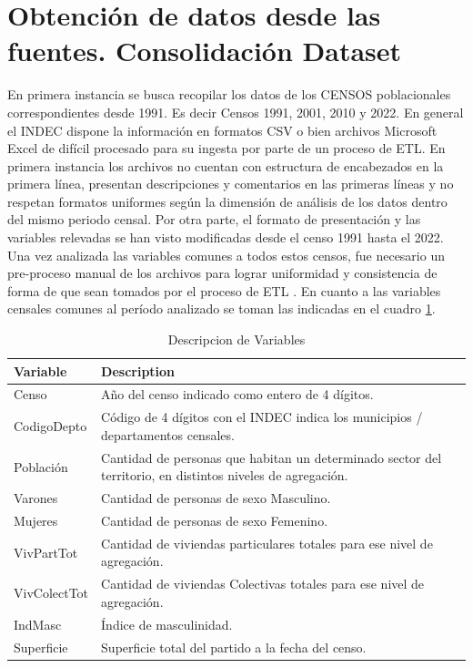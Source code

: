 \documentclass{article}
\theoremstyle{mytheoremstyle}
\theoremstyle{mytheoremstyle}
\theoremstyle{myproblemstyle}
\begin{document}
 \section{Obtención de datos desde las fuentes. Consolidación Dataset }
 En primera instancia se busca recopilar los datos de los CENSOS poblacionales correspondientes desde 1991. Es decir Censos 1991, 2001, 2010 y 2022.  En general el INDEC dispone la información en formatos CSV o bien archivos Microsoft Excel  de difícil procesado para su ingesta por parte de un  proceso de ETL.  En primera instancia los archivos no cuentan con estructura de encabezados en la primera línea, presentan descripciones y comentarios en las primeras líneas y no respetan formatos uniformes según la dimensión de análisis de los datos dentro del mismo periodo censal. Por otra parte, el formato de presentación y las variables relevadas se han visto modificadas desde el censo 1991 hasta el 2022. Una vez analizada las variables comunes a todos estos censos, fue necesario un pre-proceso manual de los archivos para lograr uniformidad y consistencia de forma de que sean tomados por el proceso de ETL .
 En cuanto a las variables censales comunes al
  período analizado se toman las indicadas en el cuadro  \ref{variables}.
 

 \begin{table}[htbp]
     \centering
     \caption{Descripcion de Variables}
     \begin{tabular}{|l|p{8cm}|}
         \hline
         \textbf{Variable} & \textbf{Description} \\
         \hline
         Censo & Año del censo indicado como entero de 4 dígitos. \\
         CodigoDepto & Código de 4 dígitos con el INDEC indica los municipios / departamentos censales. \\
         Población & Cantidad de personas que habitan un determinado sector del territorio, en distintos niveles de agregación. \\
         Varones & Cantidad de personas de sexo Masculino. \\
         Mujeres & Cantidad de personas de sexo Femenino. \\
         VivPartTot & Cantidad de viviendas particulares totales para ese nivel de agregación. \\
         VivColectTot & Cantidad de viviendas Colectivas totales para ese nivel de agregación. \\
         IndMasc & Índice de masculinidad. \\
         Superficie & Superficie total del partido a la fecha del censo. \\
         \hline
     \end{tabular}
     \label{variables}
 \end{table}
\end{document}
